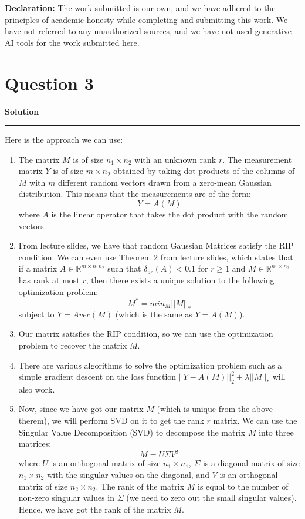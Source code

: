 \documentclass[a4paper,12pt]{article}
\title{\cooltitle{CS754 Assignment-4}}
\author{{\bf Saksham Rathi, Ekansh Ravi Shankar, Kshitij Vaidya}}
\date{}
\newenvironment{solution}[2][]{%
    \begin{mdframed}[linecolor=blue!70!black, linewidth=2pt, roundcorner=10pt, backgroundcolor=yellow!10!white, skipabove=12pt, skipbelow=12pt]%
        \textbf{\large #2}
        \par\noindent\rule{\textwidth}{0.4pt}
}{
    \end{mdframed}
}
\begin{document}
\maketitle
\textbf{Declaration:} The work submitted is our own, and
we have adhered to the principles of academic honesty while completing and submitting this work. We have not referred to any unauthorized sources, and we have not used generative AI tools for the work submitted here.

\section*{Question 3}

\begin{solution}{Solution}
Here is the approach we can use:
\begin{enumerate}
  \item The matrix $M$ is of size $n_1 \times n_2$ with an unknown rank $r$. The measurement matrix $Y$ is of size $m \times n_2$ obtained by taking dot products of the columns of $M$ with $m$ different random vectors drawn from a zero-mean Gaussian distribution. This means that the measurements are of the form:
  \[
  Y = A(M)
  \]
  where $A$ is the linear operator that takes the dot product with the random vectors.
  \item From lecture slides, we have that random Gaussian Matrices satisfy the RIP condition. We can even use Theorem 2 from lecture slides, which states that if a matrix $A \in \mathbb{R}^{m\times n_1n_2}$ such that $\delta_{5r}(A) < 0.1$ for $r \geq 1$ and $M \in \mathbb{R}^{n_1\times n_2}$ has rank at most $r$, then there exists a unique solution to the following optimization problem:
  \[M^* = min_M||M||_*\] 
  subject to $Y = Avec(M)$ (which is the same as $Y = A(M)$).
  \item Our matrix satisfies the RIP condition, so we can use the optimization problem to recover the matrix $M$.
  \item There are various algorithms to solve the optimization problem such as a simple gradient descent on the loss function $||Y - A(M)||_2^2 + \lambda ||M||_*$ will also work. 
  \item Now, since we have got our matrix $M$ (which is unique from the above therem), we will perform SVD on it to get the rank $r$ matrix. We can use the Singular Value Decomposition (SVD) to decompose the matrix $M$ into three matrices:
  \[ M = U \Sigma V^T \]
  where $U$ is an orthogonal matrix of size $n_1 \times n_1$, $\Sigma$ is a diagonal matrix of size $n_1 \times n_2$ with the singular values on the diagonal, and $V$ is an orthogonal matrix of size $n_2 \times n_2$. The rank of the matrix $M$ is equal to the number of non-zero singular values in $\Sigma$ (we need to zero out the small singular values). Hence, we have got the rank of the matrix $M$.
\end{enumerate}

\end{solution}
\end{document}
